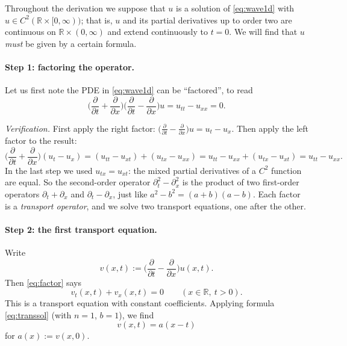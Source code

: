 \documentclass[11pt]{article}
\theoremstyle{plain}
\theoremstyle{definition}
\theoremstyle{remark}
\begin{document}
Throughout the derivation we suppose that $u$ is a solution of \eqref{eq:wave1d} with $u \in C^2(\mathbb{R} \times [0,\infty))$; that is, $u$ and its partial derivatives up to order two are continuous on $\mathbb{R} \times (0,\infty)$ and extend continuously to $t = 0$. We will find that $u$ \emph{must} be given by a certain formula.

\paragraph{Step 1: factoring the operator.} Let us first note the PDE in \eqref{eq:wave1d} can be ``factored'', to read
\begin{equation}\label{eq:factor}
\Big(\frac{\partial}{\partial t} + \frac{\partial}{\partial x}\Big)\Big(\frac{\partial}{\partial t} - \frac{\partial}{\partial x}\Big)u = u_{tt} - u_{xx} = 0.
\end{equation}

\emph{Verification.} First apply the right factor: $\big(\frac{\partial}{\partial t} - \frac{\partial}{\partial x}\big)u = u_t - u_x$. Then apply the left factor to the result:
$$ \Big(\frac{\partial}{\partial t} + \frac{\partial}{\partial x}\Big)(u_t - u_x) = (u_{tt} - u_{xt}) + (u_{tx} - u_{xx}) = u_{tt} - u_{xx} + (u_{tx} - u_{xt}) = u_{tt} - u_{xx}. $$
In the last step we used $u_{tx} = u_{xt}$: the mixed partial derivatives of a $C^2$ function are equal. So the second-order operator $\partial_t^2 - \partial_x^2$ is the product of two first-order operators $\partial_t + \partial_x$ and $\partial_t - \partial_x$, just like $a^2 - b^2 = (a + b)(a - b)$. Each factor is a \emph{transport operator}, and we solve two transport equations, one after the other.

\paragraph{Step 2: the first transport equation.} Write
\begin{equation}\label{eq:vdef}
v(x,t) := \Big(\frac{\partial}{\partial t} - \frac{\partial}{\partial x}\Big)u(x,t).
\end{equation}
Then \eqref{eq:factor} says
$$ v_t(x,t) + v_x(x,t) = 0 \qquad (x \in \mathbb{R},\ t > 0). $$
This is a transport equation with constant coefficients. Applying formula \eqref{eq:transsol} (with $n = 1$, $b = 1$), we find
\begin{equation}\label{eq:vsol}
v(x,t) = a(x - t)
\end{equation}
for $a(x) := v(x,0)$.
\end{document}
